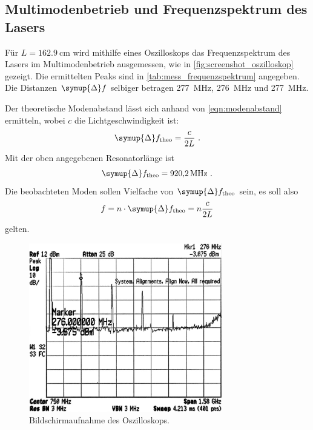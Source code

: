 \subsection{Multimodenbetrieb und Frequenzspektrum des Lasers}
\label{sec:auswertung:frequenzspektrum}
Für $L = \SI{162.9}{\centi\meter}$ wird mithilfe eines Oszilloskops das Frequenzspektrum des Lasers im Multimodenbetrieb ausgemessen,
wie in \autoref{fig:screenshot_oszilloskop} gezeigt.
Die ermittelten Peaks sind in \autoref{tab:mess_frequenzspektrum} angegeben.
Die Distanzen $\symup{\Delta}f$ selbiger betragen
\SI{277}{\mega\hertz},
\SI{276}{\mega\hertz} und
\SI{277}{\mega\hertz}.

Der theoretische Modenabstand lässt sich anhand von \autoref{eqn:modenabstand} ermitteln,
wobei $c$ die Lichtgeschwindigkeit ist:
\begin{equation}
  \symup{\Delta}f_\text{theo} = \frac{c}{2L} \ .
  \label{eqn:modenabstand}
\end{equation}
Mit der oben angegebenen Resonatorlänge ist
\[
  \symup{\Delta}f_\text{theo} = \SI{920.2}{\mega\hertz} \ .
\]
Die beobachteten Moden sollen Vielfache von $\symup{\Delta}f_\text{theo}$ sein,
es soll also
\[
  f = n \cdot \symup{\Delta}f_\text{theo} = n\frac{c}{2L}
\]
gelten.


\begin{figure}
  \centering
   \includegraphics[width=0.75\textwidth]{content/img/5_frequenzspektrum_oszilloskop_inverted.jpg}
   \caption{Bildschirmaufnahme des Oszilloskops.}
   \label{fig:screenshot_oszilloskop}
\end{figure}

